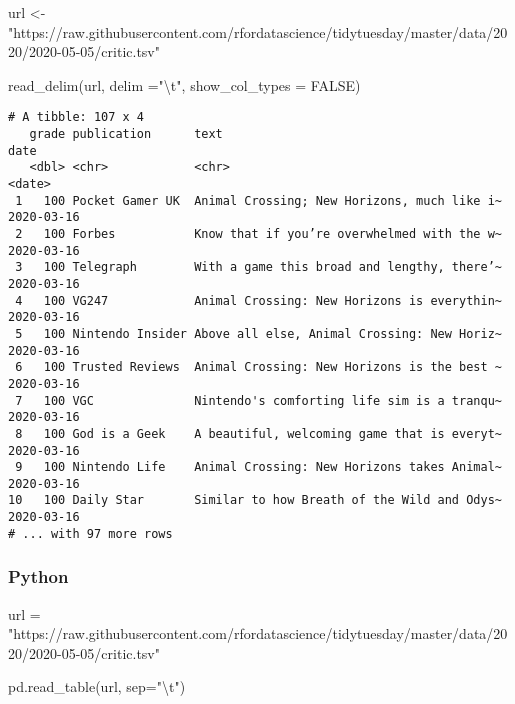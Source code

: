 \documentclass[
  letterpaper,
  DIV=11,
  numbers=noendperiod]{scrreprt}
\newenvironment{Shaded}{\begin{snugshade}}{\end{snugshade}}
\newcommand{\AttributeTok}[1]{\textcolor[rgb]{0.40,0.46,0.14}{#1}}
\newcommand{\CharTok}[1]{\textcolor[rgb]{0.13,0.47,0.30}{#1}}
\newcommand{\ConstantTok}[1]{\textcolor[rgb]{0.56,0.35,0.01}{#1}}
\newcommand{\FunctionTok}[1]{\textcolor[rgb]{0.28,0.35,0.67}{#1}}
\newcommand{\NormalTok}[1]{\textcolor[rgb]{0.00,0.46,0.62}{#1}}
\newcommand{\OperatorTok}[1]{\textcolor[rgb]{0.37,0.37,0.37}{#1}}
\newcommand{\OtherTok}[1]{\textcolor[rgb]{0.00,0.46,0.62}{#1}}
\newcommand{\SpecialCharTok}[1]{\textcolor[rgb]{0.37,0.37,0.37}{#1}}
\newcommand{\StringTok}[1]{\textcolor[rgb]{0.13,0.47,0.30}{#1}}
\begin{document}
\begin{Shaded}
\begin{Highlighting}[]
\NormalTok{url }\OtherTok{\textless{}{-}} \StringTok{"https://raw.githubusercontent.com/rfordatascience/tidytuesday/master/data/2020/2020{-}05{-}05/critic.tsv"}

\FunctionTok{read\_delim}\NormalTok{(url, }\AttributeTok{delim =}\StringTok{"}\SpecialCharTok{\textbackslash{}t}\StringTok{"}\NormalTok{, }\AttributeTok{show\_col\_types =} \ConstantTok{FALSE}\NormalTok{)}
\end{Highlighting}
\end{Shaded}

\begin{verbatim}
# A tibble: 107 x 4
   grade publication      text                                        date      
   <dbl> <chr>            <chr>                                       <date>    
 1   100 Pocket Gamer UK  Animal Crossing; New Horizons, much like i~ 2020-03-16
 2   100 Forbes           Know that if you’re overwhelmed with the w~ 2020-03-16
 3   100 Telegraph        With a game this broad and lengthy, there’~ 2020-03-16
 4   100 VG247            Animal Crossing: New Horizons is everythin~ 2020-03-16
 5   100 Nintendo Insider Above all else, Animal Crossing: New Horiz~ 2020-03-16
 6   100 Trusted Reviews  Animal Crossing: New Horizons is the best ~ 2020-03-16
 7   100 VGC              Nintendo's comforting life sim is a tranqu~ 2020-03-16
 8   100 God is a Geek    A beautiful, welcoming game that is everyt~ 2020-03-16
 9   100 Nintendo Life    Animal Crossing: New Horizons takes Animal~ 2020-03-16
10   100 Daily Star       Similar to how Breath of the Wild and Odys~ 2020-03-16
# ... with 97 more rows
\end{verbatim}

\hypertarget{python-3}{%
\subsubsection{Python}\label{python-3}}

\begin{Shaded}
\begin{Highlighting}[]
\NormalTok{url }\OperatorTok{=} \StringTok{"https://raw.githubusercontent.com/rfordatascience/tidytuesday/master/data/2020/2020{-}05{-}05/critic.tsv"}

\NormalTok{pd.read\_table(url, sep}\OperatorTok{=}\StringTok{"}\CharTok{\textbackslash{}t}\StringTok{"}\NormalTok{)}
\end{Highlighting}
\end{Shaded}
\end{document}

